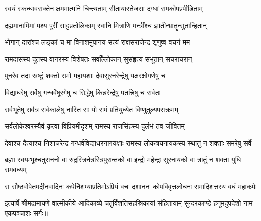 \twolineshloka
{स्वयं स्कन्धावसक्तेन क्षममात्मनि चिन्त्यताम्}
{सीतायास्तेजसा दग्धां रामकोपप्रपीडिताम्}

\twolineshloka
{दह्यमानामिमां पश्य पुरीं साट्टप्रतोलिकाम्}
{स्वानि मित्राणि मन्त्रींश्च ज्ञातीन्भ्रातॄन्सुतान्हितान्}

\twolineshloka
{भोगान् दारांश्च लङ्कां च मा विनाशमुपानय}
{सत्यं राक्षसराजेन्द्र शृणुष्व वचनं मम}

\twolineshloka
{रामदासस्य दूतस्य वानरस्य विशेषतः}
{सर्वाँल्लोकान् सुसंहृत्य सभूतान् सचराचरान्}

\twolineshloka
{पुनरेव तदा स्रष्टुं शक्तो रामो महायशाः}
{देवासुरनरेन्द्रेषु यक्षरक्षोगणेषु च}

\twolineshloka
{विद्याधरेषु सर्वेषु गन्धर्वेषूरगेषु च}
{सिद्धेषु किन्नरेन्द्रेषु पतत्त्रिषु च सर्वतः}

\twolineshloka
{सर्वभूतेषु सर्वत्र सर्वकालेषु नास्ति सः}
{यो रामं प्रतियुध्येत विष्णुतुल्यपराक्रमम्}

\twolineshloka
{सर्वलोकेश्वरस्यैवं कृत्वा विप्रियमीदृशम्}
{रामस्य राजसिंहस्य दुर्लभं तव जीवितम्}

\fourlineindentedshloka
{देवाश्च दैत्याश्च निशाचरेन्द्र}
{गन्धर्वविद्याधरनागयक्षाः}
{रामस्य लोकत्रयनायकस्य}
{स्थातुं न शक्ताः समरेषु सर्वे}

\fourlineindentedshloka
{ब्रह्मा स्वयम्भूश्चतुराननो वा}
{रुद्रस्त्रिनेत्रस्त्रिपुरान्तको वा}
{इन्द्रो महेन्द्रः सुरनायको वा}
{त्रातुं न शक्ता युधि रामवध्यम्}

\fourlineindentedshloka
{स सौष्ठवोपेतमदीनवादिनः}
{कपेर्निशम्याप्रतिमोऽप्रियं वचः}
{दशाननः कोपविवृत्तलोचनः}
{समादिशत्तस्य वधं महाकपेः}

इत्यार्षे श्रीमद्रामायणे वाल्मीकीये आदिकाव्ये चतुर्विंशतिसहस्रिकायां संहितायाम् सुन्दरकाण्डे हनूमदुपदेशो नाम एकपञ्चाशः सर्गः॥

\closesection